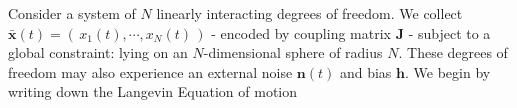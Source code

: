 Consider a system of $N$ linearly interacting degrees of freedom. We collect  $\mathbf{\bar x}(t) = \left(\,x_1(t),\cdots, x_N(t)\,\right)$ - encoded by coupling matrix $\mathbf{J}$ - subject to a global constraint: lying on an $N$-dimensional sphere of radius $N$. These degrees of freedom may also experience an external noise $\mathbf{n}(t)$ and bias $\mathbf{h}$. We begin by writing down the Langevin Equation of motion
